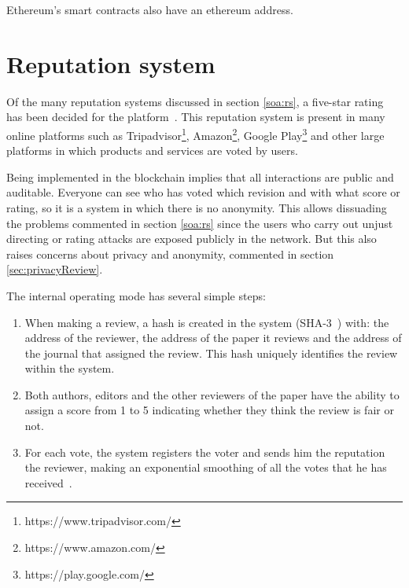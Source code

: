 
Ethereum's smart contracts also have an ethereum address. 

\section{Reputation system}
\label{rep:system}

Of the many reputation systems discussed in section \ref{soa:rs}, a five-star
rating has been decided for the platform~\cite{kinateder2003architecture}. This
reputation system is present in many online platforms such as
Tripadvisor\footnote{https://www.tripadvisor.com/},
Amazon\footnote{https://www.amazon.com/}, Google
Play\footnote{https://play.google.com/} and other large platforms in which
products and services are voted by users.

Being implemented in the blockchain implies that all interactions are public and
auditable. Everyone can see who has voted which revision and with what score or
rating, so it is a system in which there is no anonymity. This allows dissuading
the problems commented in section \ref{soa:rs} since the users who carry out
unjust directing or rating attacks are exposed publicly in the network. But this
also raises concerns about privacy and anonymity, commented in section
\ref{sec:privacyReview}.

The internal operating mode has several simple steps:
\begin{enumerate}
\item When making a review, a hash is created in the system
  (SHA-3~\cite{aumasson2008sha}) with: the address of the reviewer, the address
  of the paper it reviews and the address of the journal that assigned the
  review. This hash uniquely identifies the review within the system.
  
\item Both authors, editors and the other reviewers of the paper have the
  ability to assign a score from 1 to 5 indicating whether they think the review
  is fair or not.
  
\item For each vote, the system registers the voter and sends him the reputation
     the reviewer, making an exponential smoothing of all the votes that he has
     received~\cite{gardner1985exponential}.
\end{enumerate}

